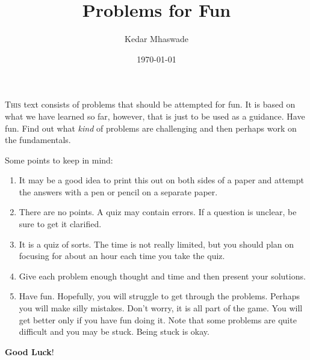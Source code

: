 \documentclass[12pt]{exam}         %
\title{Problems for Fun}
\author{Kedar Mhaswade}
\date{\today}
\begin{document}
\maketitle

\lettrine[lines=3]{T}{his} text consists of problems that should be attempted for fun. It is based on what we have learned
so far, however, that is just to be used as a guidance. Have fun. Find out what \emph{kind} of problems
are challenging and then perhaps work on the fundamentals.

Some points to keep in mind:
\begin{enumerate}
\item It may be a good idea to print this out on both sides of a paper and attempt the answers with a pen or pencil on a separate paper.
\item There are no points. A quiz may contain errors. If a question is unclear, be sure to get it clarified.
\item It is a quiz of sorts. The time is not really limited, but you should plan on focusing for about an hour each time you take the quiz.
\item Give each problem enough thought and time and then present your solutions.
\item Have fun. Hopefully, you will struggle to get through the problems. Perhaps you will make silly mistakes. Don't worry, it is all part of the game. You will get better only if you have fun doing it. Note that some problems are quite difficult and you may be stuck. Being stuck is okay.

\end{enumerate}
\textbf{Good Luck}!

\newcommand\Que[1]{%
   \leavevmode\par
   \stepcounter{question}
   \noindent
   Problem \thequestion --- #1\par}
\end{document}
